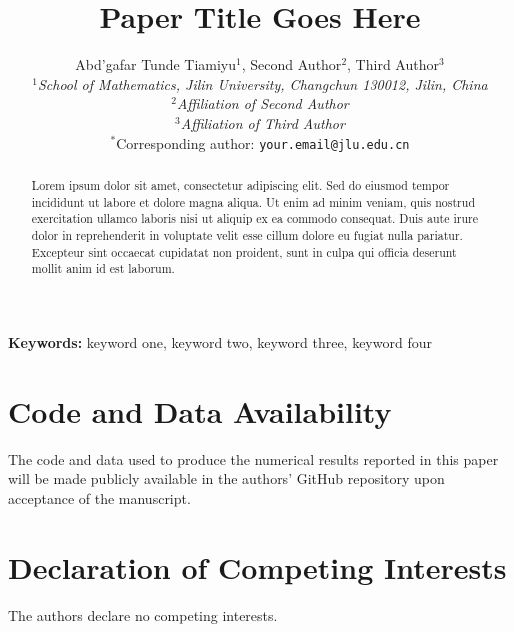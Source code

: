 \documentclass[11pt,a4paper]{article}
\title{\textbf{Paper Title Goes Here}}
\author{%
Abd'gafar Tunde Tiamiyu$^{1}$, \quad
Second Author$^{2}$, \quad
Third Author$^{3}$\\[1em]
{\small\itshape $^{1}$School of Mathematics, Jilin University, Changchun 130012, Jilin, China}\\
{\small\itshape $^{2}$Affiliation of Second Author}\\
{\small\itshape $^{3}$Affiliation of Third Author}\\[0.5em]
{\small $^{*}$Corresponding author: \texttt{your.email@jlu.edu.cn}}
}
\date{}
\theoremstyle{definition}
\theoremstyle{remark}
\begin{document}
\maketitle

\begin{abstract}
\noindent
Lorem ipsum dolor sit amet, consectetur adipiscing elit. Sed do eiusmod tempor
incididunt ut labore et dolore magna aliqua. Ut enim ad minim veniam, quis
nostrud exercitation ullamco laboris nisi ut aliquip ex ea commodo consequat.
Duis aute irure dolor in reprehenderit in voluptate velit esse cillum dolore eu
fugiat nulla pariatur. Excepteur sint occaecat cupidatat non proident, sunt in
culpa qui officia deserunt mollit anim id est laborum.
\end{abstract}

\medskip
\noindent\textbf{Keywords:} keyword one, keyword two, keyword three, keyword four








% 
% 
% 


\section*{Code and Data Availability}
The code and data used to produce the numerical results reported in this paper
will be made publicly available in the authors' GitHub repository upon
acceptance of the manuscript.

\section*{Declaration of Competing Interests}
The authors declare no competing interests.



\end{document}
